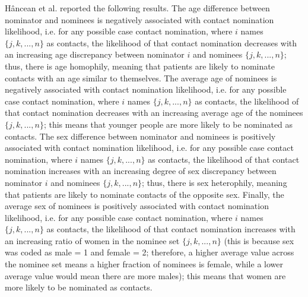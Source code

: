 H\^ancean et al. reported the following results. The age difference between nominator and nominees is negatively associated with contact nomination likelihood, i.e. for any possible case contact nomination, where $i$ names $\{j,k,...,n\}$ as contacts, the likelihood of that contact nomination decreases with an increasing age discrepancy between nominator $i$ and nominees $\{j,k,...,n\}$; thus, there is age homophily, meaning that patients are likely to nominate contacts with an age similar to themselves. The average age of nominees is negatively associated with contact nomination likelihood, i.e. for any possible case contact nomination, where $i$ names $\{j,k,...,n\}$ as contacts, the likelihood of that contact nomination decreases with an increasing average age of the nominees $\{j,k,...,n\}$; this means that younger people are more likely to be nominated as contacts. The sex difference between nominator and nominees is positively associated with contact nomination likelihood, i.e. for any possible case contact nomination, where $i$ names $\{j,k,...,n\}$ as contacts, the likelihood of that contact nomination increases with an increasing degree of sex discrepancy between nominator $i$ and nominees $\{j,k,...,n\}$; thus, there is sex heterophily, meaning that patients are likely to nominate contacts of the opposite sex. Finally, the average sex of nominees is positively associated with contact nomination likelihood, i.e. for any possible case contact nomination, where $i$ names $\{j,k,...,n\}$ as contacts, the likelihood of that contact nomination increases with an increasing ratio of women in the nominee set $\{j,k,...,n\}$ (this is because sex was coded as male = 1 and female = 2; therefore, a higher average value across the nominee set means a higher fraction of nominees is female, while a lower average value would mean there are more males); this means that women are more likely to be nominated as contacts.

